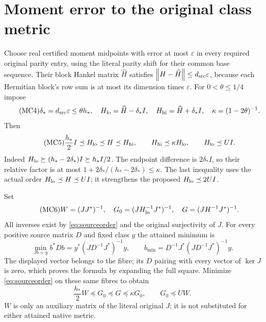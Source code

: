 \documentclass[11pt]{article}
\newcommand{\norm}[1]{\left\lVert#1\right\rVert}
\begin{document}
\section{Moment error to the original class metric}

Choose real certified moment midpoints with error at most
$\varepsilon$ in every required original parity entry, using the
literal parity shift for their common base sequence. Their block
Hankel matrix $\widehat H$ satisfies
$\norm{H-\widehat H}\le d_{\rm src}\varepsilon$, because
each Hermitian block's row sum is at most its dimension times
$\varepsilon$. For $0<\theta\le1/4$ impose
\begin{equation}\tag{MC4}\label{eq:momentbudget}
 \delta_*=d_{\rm src}\varepsilon\le\theta h_*,\quad
 H_{\rm lo}=\widehat H-\delta_*I,\quad
 H_{\rm hi}=\widehat H+\delta_*I,\quad
 \kappa=(1-2\theta)^{-1}.
\end{equation}
Then
\begin{equation}\tag{MC5}\label{eq:sourceorder}
 \frac{h_*}{2}I\preceq H_{\rm lo}\preceq H\preceq H_{\rm hi},
 \qquad H_{\rm hi}\preceq\kappa H_{\rm lo},\qquad
 H_{\rm lo}\preceq UI.
\end{equation}
Indeed $H_{\rm lo}\succeq(h_*-2\delta_*)I\succeq h_*I/2$.
The endpoint difference is $2\delta_*I$, so their relative factor
is at most $1+2\delta_* /(h_*-2\delta_*)\le\kappa$.
The last inequality uses the actual order $H_{\rm lo}\preceq
H\preceq UI$; it strengthens the proposed $H_{\rm lo}\preceq2UI$.

Set
\begin{equation}\tag{MC6}\label{eq:G}
 W=(JJ^*)^{-1},\quad
 G_0=(JH_{\rm lo}^{-1}J^*)^{-1},\quad
 G=(JH^{-1}J^*)^{-1}.
\end{equation}
All inverses exist by \eqref{eq:sourceorder} and the original
surjectivity of $J$. For every positive source matrix $D$ and
fixed class $y$ the attained minimum is
\[
 \min_{Jb=y}b^*Db=y^*(JD^{-1}J^*)^{-1}y,
 \qquad b_{\min}=D^{-1}J^*(JD^{-1}J^*)^{-1}y.
\]
The displayed vector belongs to the fibre; its $D$ pairing with
every vector of $\ker J$ is zero, which proves the formula by
expanding the full square. Minimize \eqref{eq:sourceorder} on
these same fibres to obtain
\begin{equation}\tag{MC7}\label{eq:classorder}
 \boxed{\frac{h_*}{2}W\preceq G_0\preceq G\preceq\kappa G_0,
                    \qquad G_0\preceq UW.}
\end{equation}
$W$ is only an auxiliary matrix of the literal original $J$;
it is not substituted for either attained native metric.
\end{document}
